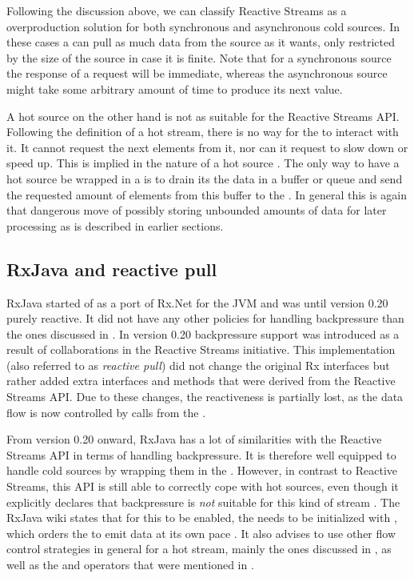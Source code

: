 Following the discussion above, we can classify Reactive Streams as a overproduction solution for both synchronous and asynchronous cold sources. In these cases a  can pull as much data from the source as it wants, only restricted by the size of the source in case it is finite. Note that for a synchronous source the response of a request will be immediate, whereas the asynchronous source might take some arbitrary amount of time to produce its next value.

A hot source on the other hand is not as suitable for the Reactive Streams API. Following the definition of a hot stream, there is no way for the  to interact with it. It cannot request the next  elements from it, nor can it request to slow down or speed up. This is implied in the nature of a hot source \cite{berry1991-Reactive}. The only way to have a hot source be wrapped in a  is to drain its the data in a buffer or queue and send the requested amount of elements from this buffer to the . In general this is again that dangerous move of possibly storing unbounded amounts of data for later processing as is described in earlier sections.

\subsection{RxJava and reactive pull}
\label{subsec:handling-overproduction-with-rxjava}
RxJava started of as a port of Rx.Net for the JVM and was until version 0.20 purely reactive. It did not have any other policies for handling backpressure than the ones discussed in . In version 0.20 backpressure support was introduced as a result of collaborations in the Reactive Streams initiative. This implementation (also referred to as \textit{reactive pull}) did not change the original Rx interfaces but rather added extra interfaces and methods that were derived from the Reactive Streams API. Due to these changes, the reactiveness is partially lost, as the data flow is now controlled by  calls from the \obv.

From version 0.20 onward, RxJava has a lot of similarities with the Reactive Streams API in terms of handling backpressure. It is therefore well equipped to handle cold sources by wrapping them in the \obs. However, in contrast to Reactive Streams, this API is still able to correctly cope with hot sources, even though it explicitly declares that backpressure is \emph{not} suitable for this kind of stream \cite{RxJava-Wiki-HotCold}. The RxJava wiki states that for this to be enabled, the \obs needs to be initialized with , which orders the \obs to emit data at its own pace \cite{RxJava-Wiki-Backpressure}. It also advises to use other flow control strategies in general for a hot stream, mainly the ones discussed in , as well as the  and  operators that were mentioned in .


